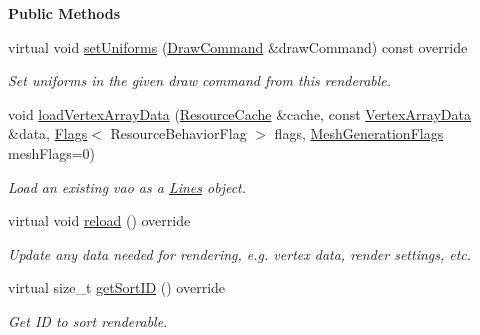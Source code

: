 \begin{Indent}\textbf{ Public Methods}\par
\begin{DoxyCompactItemize}
\item 
virtual void \mbox{\hyperlink{classrev_1_1_lines_a35469d8c869e1a6ca1906bb43cfc4861}{set\+Uniforms}} (\mbox{\hyperlink{classrev_1_1_draw_command}{Draw\+Command}} \&draw\+Command) const override
\begin{DoxyCompactList}\small\item\em Set uniforms in the given draw command from this renderable. \end{DoxyCompactList}\item 
\mbox{\label{classrev_1_1_lines_ade537e892302af6fdbd5f2fade9fb642}} 
void \mbox{\hyperlink{classrev_1_1_lines_ade537e892302af6fdbd5f2fade9fb642}{load\+Vertex\+Array\+Data}} (\mbox{\hyperlink{classrev_1_1_resource_cache}{Resource\+Cache}} \&cache, const \mbox{\hyperlink{classrev_1_1_vertex_array_data}{Vertex\+Array\+Data}} \&data, \mbox{\hyperlink{classrev_1_1_flags}{Flags}}$<$ Resource\+Behavior\+Flag $>$ flags, \mbox{\hyperlink{classrev_1_1_flags}{Mesh\+Generation\+Flags}} mesh\+Flags=0)
\begin{DoxyCompactList}\small\item\em Load an existing vao as a \mbox{\hyperlink{classrev_1_1_lines}{Lines}} object. \end{DoxyCompactList}\item 
\mbox{\label{classrev_1_1_lines_a25311363c75d2acd0235e6786c076007}} 
virtual void \mbox{\hyperlink{classrev_1_1_lines_a25311363c75d2acd0235e6786c076007}{reload}} () override
\begin{DoxyCompactList}\small\item\em Update any data needed for rendering, e.\+g. vertex data, render settings, etc. \end{DoxyCompactList}\item 
\mbox{\label{classrev_1_1_lines_a50239aad4f1c51575d92c2b4ab4ae99a}} 
virtual size\+\_\+t \mbox{\hyperlink{classrev_1_1_lines_a50239aad4f1c51575d92c2b4ab4ae99a}{get\+Sort\+ID}} () override
\begin{DoxyCompactList}\small\item\em Get ID to sort renderable. \end{DoxyCompactList}\end{DoxyCompactItemize}
\end{Indent}
